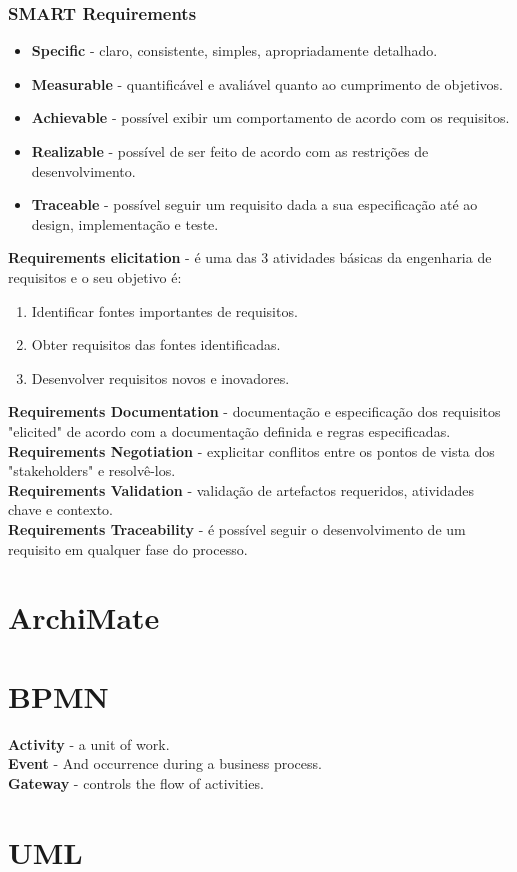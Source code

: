 \documentclass[12pt]{article}
\begin{document}
\subsubsection*{SMART Requirements}

\begin{itemize}
    \item \textbf{Specific} - claro, consistente, simples, apropriadamente detalhado.
    \item \textbf{Measurable} - quantificável e avaliável quanto ao cumprimento de objetivos.
    \item \textbf{Achievable} - possível exibir um comportamento de acordo com os requisitos.
    \item \textbf{Realizable} - possível de ser feito de acordo com as restrições de desenvolvimento.
    \item \textbf{Traceable} - possível seguir um requisito dada a sua especificação até ao design, implementação e teste.  
\end{itemize}

\textbf{Requirements elicitation} - é uma das 3 atividades básicas da engenharia de requisitos e o seu objetivo é:
\begin{enumerate}[topsep=0pt, itemsep=0pt]
    \item Identificar fontes importantes de requisitos.
    \item Obter requisitos das fontes identificadas.
    \item Desenvolver requisitos novos e inovadores.
\end{enumerate}

\textbf{Requirements Documentation} - documentação e especificação dos requisitos "elicited" de acordo com a documentação definida e regras especificadas.
\\[6pt]
\textbf{Requirements Negotiation} - explicitar conflitos entre os pontos de vista dos "stakeholders" e resolvê-los.
\\[6pt]
\textbf{Requirements Validation} - validação de artefactos requeridos, atividades chave e contexto.
\\[6pt]
\textbf{Requirements Traceability} - é possível seguir o desenvolvimento de um requisito em qualquer fase do processo.

\newpage

\section{ArchiMate}



\newpage

\section{BPMN}

\textbf{Activity} - a unit of work.
\\[6pt]
\textbf{Event} - And occurrence during a business process.
\\[6pt]
\textbf{Gateway} - controls the flow of activities.


\newpage

\section{UML}
\end{document}
